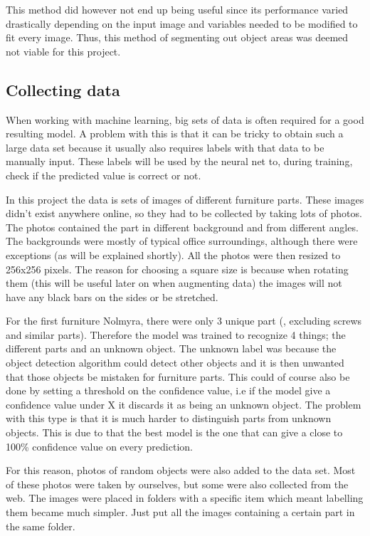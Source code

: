 This method did however not end up being useful since its performance varied drastically depending on the input image and variables needed to be modified to fit every image. Thus, this method of segmenting out object areas was deemed not viable for this project.

\subsection{Collecting data}
When working with machine learning, big sets of data is often required for a good resulting model.
A problem with this is that it can be tricky to obtain such a large data set because it usually also requires
labels with that data to be manually input. These labels will be used by the neural net to, during training, check if
the predicted value is correct or not.

In this project the data is sets of images of different furniture parts. These images didn't exist anywhere online, so they had to be collected by taking lots of photos. The photos contained the part in different background and from different angles. The backgrounds were mostly of typical office surroundings, although there were exceptions (as will be explained shortly). All the photos were then resized to 256x256 pixels. The reason for choosing a square size is because when rotating them (this will be useful later on when augmenting data) the images will not have any black bars on the sides or be stretched.

For the first furniture Nolmyra, there were only 3 unique part (, excluding screws and similar parts). Therefore the model was trained to recognize 4 things; the different parts and an unknown object. The unknown label was because the object detection algorithm could detect other objects and it is then unwanted that those objects be mistaken for furniture parts. This could of course also be done by setting a threshold on the confidence value, i.e if the model give a confidence value under X it discards it as being an unknown object. The problem with this type is that it is much harder to distinguish parts from unknown objects. This is due to that the best model is the one that can give a close to 100\% confidence value on every prediction.

For this reason, photos of random objects were also added to the data set. Most of these photos were taken by ourselves, but some were also collected from the web. The images were placed in folders with a specific item which meant labelling them became much simpler. Just put all the images containing a certain part in the same folder.


